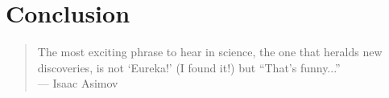 





%
%




%
%
%
%










\chapter{Conclusion}

\begin{flushright}{\slshape

    \begin{quote}
    The most exciting phrase to hear in science, the one that heralds new discoveries, is not `Eureka!' (I found it!) but ``That's funny...'' \\
    — Isaac Asimov
    \end{quote}

\bigskip
\bigskip

}
\end{flushright}



